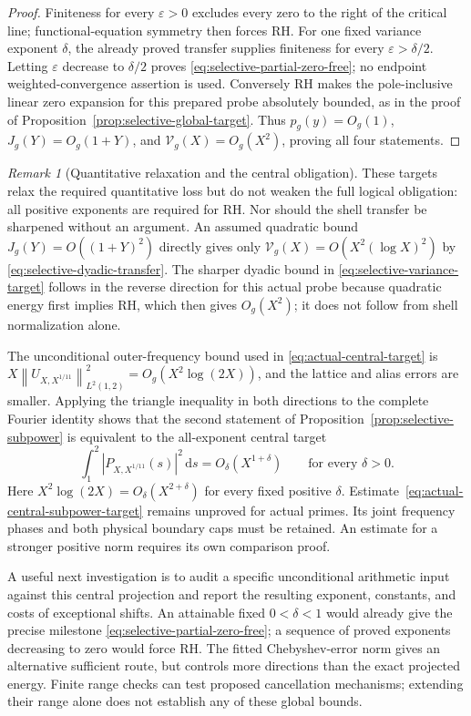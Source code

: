 \documentclass[11pt]{article}
\numberwithin{equation}{section}
\theoremstyle{definition}
\theoremstyle{remark}
\newtheorem{remark}[theorem]{Remark}
\newcommand{\norm}[1]{\left\lVert #1\right\rVert}
\newcommand{\dd}{\,\mathrm d}
\begin{document}
\begin{proof}
Finiteness for every \(\varepsilon>0\) excludes every zero to
the right of the critical line; functional-equation symmetry then
forces RH. For one fixed variance exponent \(\delta\), the already
proved transfer supplies finiteness for every
\(\varepsilon>\delta/2\). Letting \(\varepsilon\) decrease to
\(\delta/2\) proves \eqref{eq:selective-partial-zero-free}; no
endpoint weighted-convergence assertion is used. Conversely RH
makes the pole-inclusive linear zero expansion for this prepared
probe absolutely bounded, as in the proof of
Proposition~\ref{prop:selective-global-target}. Thus
\(p_g(y)=O_g(1)\), \(J_g(Y)=O_g(1+Y)\), and
\(\mathcal V_g(X)=O_g(X^2)\), proving all four statements.
\end{proof}

\begin{remark}[Quantitative relaxation and the central obligation]
\label{rem:selective-subpower-targets}
These targets relax the required quantitative loss but do not weaken
the full logical obligation: all positive exponents are required for
RH. Nor should the shell transfer be sharpened without an argument.
An assumed quadratic bound \(J_g(Y)=O((1+Y)^2)\) directly gives
only \(\mathcal V_g(X)=O(X^2(\log X)^2)\) by
\eqref{eq:selective-dyadic-transfer}. The sharper dyadic bound in
\eqref{eq:selective-variance-target} follows in the reverse direction
for this actual probe because quadratic energy first implies RH,
which then gives \(O_g(X^2)\); it does not follow from shell
normalization alone.

The unconditional outer-frequency bound used in
\eqref{eq:actual-central-target} is
\(X\norm{U_{X,X^{1/11}}}_{L^2(1,2)}^2=O_g(X^2\log(2X))\),
and the lattice and alias errors are smaller. Applying the triangle
inequality in both directions to the complete Fourier identity shows
that the second statement of Proposition~\ref{prop:selective-subpower}
is equivalent to the all-exponent central target
\begin{equation}\label{eq:actual-central-subpower-target}
\int_1^2|P_{X,X^{1/11}}(s)|^2\dd s
=O_\delta(X^{1+\delta})\qquad\text{for every }\delta>0.
\end{equation}
Here \(X^2\log(2X)=O_\delta(X^{2+\delta})\) for every fixed
positive \(\delta\). Estimate~\eqref{eq:actual-central-subpower-target}
remains unproved for actual primes. Its joint frequency phases and
both physical boundary caps must be retained. An estimate for a
stronger positive norm requires its own comparison proof.

A useful next investigation is to audit a specific unconditional
arithmetic input against this central projection and report the
resulting exponent, constants, and costs of exceptional shifts.
An attainable fixed \(0<\delta<1\) would already give the precise
milestone \eqref{eq:selective-partial-zero-free}; a sequence of
proved exponents decreasing to zero would force RH. The fitted
Chebyshev-error norm gives an alternative sufficient route, but
controls more directions than the exact projected energy. Finite
range checks can test proposed cancellation mechanisms; extending
their range alone does not establish any of these global bounds.
\end{remark}
\end{document}
